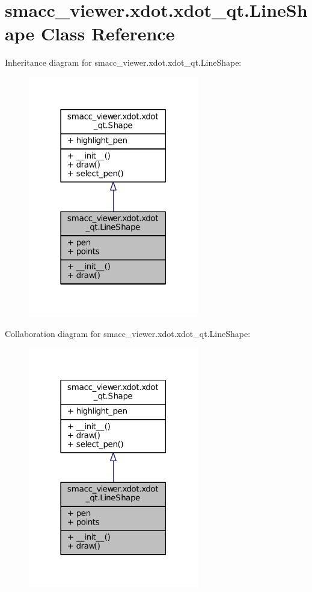\hypertarget{classsmacc__viewer_1_1xdot_1_1xdot__qt_1_1LineShape}{}\section{smacc\+\_\+viewer.\+xdot.\+xdot\+\_\+qt.\+Line\+Shape Class Reference}
\label{classsmacc__viewer_1_1xdot_1_1xdot__qt_1_1LineShape}


Inheritance diagram for smacc\+\_\+viewer.\+xdot.\+xdot\+\_\+qt.\+Line\+Shape\+:
\nopagebreak
\begin{figure}[H]
\begin{center}
\leavevmode
\includegraphics[width=211pt]{classsmacc__viewer_1_1xdot_1_1xdot__qt_1_1LineShape__inherit__graph}
\end{center}
\end{figure}


Collaboration diagram for smacc\+\_\+viewer.\+xdot.\+xdot\+\_\+qt.\+Line\+Shape\+:
\nopagebreak
\begin{figure}[H]
\begin{center}
\leavevmode
\includegraphics[width=211pt]{classsmacc__viewer_1_1xdot_1_1xdot__qt_1_1LineShape__coll__graph}
\end{center}
\end{figure}
